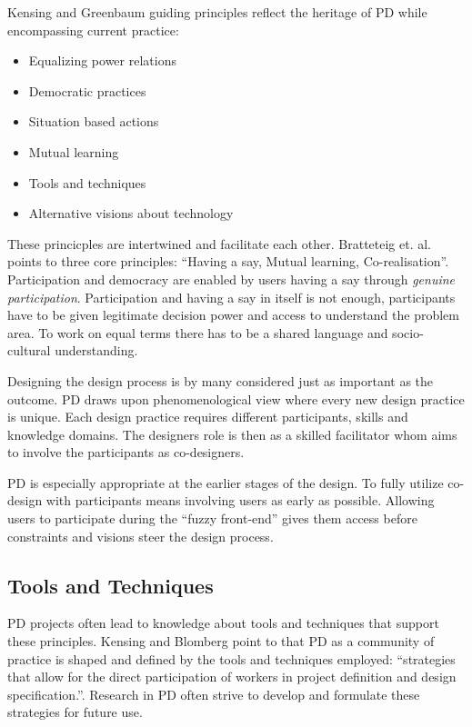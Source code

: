 \documentclass[11pt,UKenglish, a4paper]{article}
\begin{document}
Kensing and Greenbaum guiding principles reflect the heritage of PD while encompassing current practice:
\begin{itemize}
\item{Equalizing power relations}
\item{Democratic practices}
\item{Situation based actions}
\item{Mutual learning}
\item{Tools and techniques}
\item{Alternative visions about technology}
\end{itemize}\cite[p.~33-34]{Kensing2013Heritage}
These princicples are intertwined and facilitate each other. Bratteteig et. al. points to three core principles: ``Having a say, Mutual learning, Co-realisation''. Participation and democracy are enabled by users having a say through \textit{genuine participation}. Participation and having a say in itself is not enough, participants have to be given legitimate decision power and access to understand the problem area. To work on equal terms there has to be a shared language and socio-cultural understanding\cite[p.152]{Loewgren2004Thoughtful}.  

Designing the design process is by many considered just as important as the outcome. PD draws upon phenomenological view where every new design practice is unique. Each design practice requires different participants, skills and knowledge domains. The designers role is then as a skilled facilitator whom aims to involve the participants as co-designers.   
  
PD is especially appropriate at the earlier stages of the design. To fully utilize co-design with participants means involving users as early as possible.  Allowing users to participate during the ``fuzzy front-end''\cite[p.~6]{Sanders2008CoCreation} gives them access before constraints and visions steer the design process\cite{Loewgren2004Thoughtful}. 

\subsection{Tools and Techniques}
PD projects often lead to knowledge about tools and techniques that support these principles. Kensing and Blomberg point to that PD as a community of practice is shaped and defined by the tools and techniques employed: ``strategies that allow for the direct participation of workers in project definition and design specification.''\cite[p.~181]{Kensing1998Participatory}. Research in PD often strive to develop and formulate these strategies for future use. 
\end{document}
